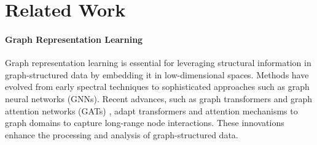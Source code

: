 \section{Related Work} \label{sec:related_work}

\paragraph{Graph Representation Learning} Graph representation learning is essential for leveraging structural information in graph-structured data by embedding it in low-dimensional spaces. \cite{deepwalk, node2vec, network_embedding, pmlr-v196-hy22a} Methods have evolved from early spectral techniques to sophisticated approaches such as graph neural networks (GNNs). Recent advances, such as graph transformers \cite{NEURIPS2019_9d63484a, kim2022pure, pmlr-v202-cai23b, 10.1063/5.0152833} and graph attention networks (GATs) \cite{velickovic2018graph}, adapt transformers and attention mechanisms to graph domains to capture long-range node interactions. These innovations enhance the processing and analysis of graph-structured data.


